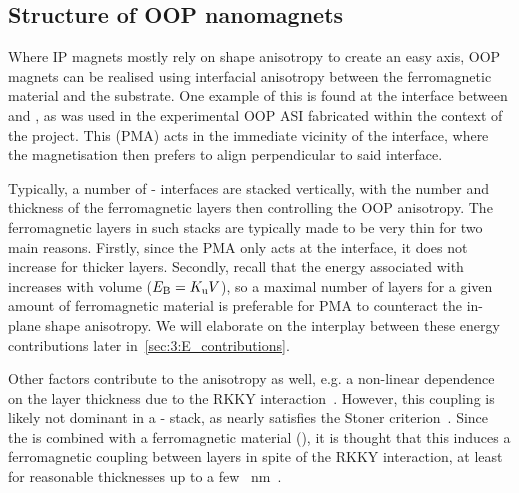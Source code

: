 \subsection{Structure of OOP nanomagnets} %
\label{sec:3:OOP_nanomagnet_PMA}
Where IP magnets mostly rely on shape anisotropy to create an easy axis, OOP magnets can be realised using interfacial anisotropy between the ferromagnetic material and the substrate.
One example of this is found at the interface between  and , as was used in the experimental OOP ASI fabricated within the context of the \spinengine project.
This  (PMA) acts in the immediate vicinity of the interface, where the magnetisation then prefers to align perpendicular to said interface. \par
Typically, a number of - interfaces are stacked vertically, with the number and thickness of the ferromagnetic  layers then controlling the OOP anisotropy.
The ferromagnetic layers in such stacks are typically made to be very thin for two main reasons.
Firstly, since the PMA only acts at the interface, it does not increase for thicker layers.
Secondly, recall that the energy associated with  increases with volume ($E_\mathrm{B}=K_\mathrm{u}V$), so a maximal number of layers for a given amount of ferromagnetic material is preferable for PMA to counteract the in-plane shape anisotropy.
We will elaborate on the interplay between these energy contributions later in~\cref{sec:3:E_contributions}. \par
Other factors contribute to the anisotropy as well, e.g. a non-linear dependence on the  layer thickness due to the RKKY interaction~\cite{RKKY_RK,RKKY_K,RKKY_Y}.
However, this coupling is likely not dominant in a - stack, as  nearly satisfies the Stoner criterion~\cite{PtMagneticOrder}.
Since the  is combined with a ferromagnetic material (), it is thought that this induces a ferromagnetic coupling between  layers in spite of the RKKY interaction, at least for reasonable  thicknesses up to a few \SI{}{\nano\metre}~\cite{PerpendicularMagnetizationASI}.

